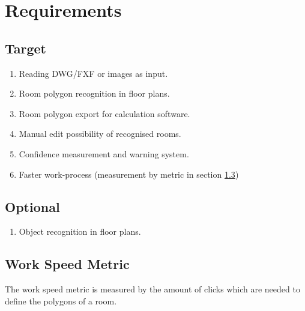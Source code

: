 \chapter{Requirements}
\section{Target}

\begin{enumerate}
\item Reading DWG/FXF or images as input.
\item Room polygon recognition in floor plans.
\item Room polygon export for calculation software.
\item Manual edit possibility of recognised rooms.
\item Confidence measurement and warning system.
\item Faster work-process (measurement by metric in section \ref{sec:metric})
\end{enumerate}

\section{Optional}

\begin{enumerate}
\item Object recognition in floor plans.
\end{enumerate}

\section{Work Speed Metric}
\label{sec:metric}
The work speed metric is measured by the amount of clicks which are needed to define the polygons of a room.